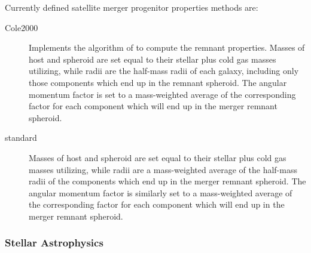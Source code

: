 Currently defined satellite merger progenitor properties methods are:
\begin{description}
 \item [{\normalfont \ttfamily Cole2000}] Implements the algorithm of \cite{cole_hierarchical_2000} to compute the remnant properties. Masses of host and spheroid are set equal to their stellar plus cold gas masses utilizing, while radii are the half-mass radii of each galaxy, including only those components which end up in the remnant spheroid. The angular momentum factor is set to a mass-weighted average of the corresponding factor for each component which will end up in the merger remnant spheroid.
 \item [{\normalfont \ttfamily standard}] Masses of host and spheroid are set equal to their stellar plus cold gas masses utilizing, while radii are a mass-weighted average of the half-mass radii of the components which end up in the merger remnant spheroid. The angular momentum factor is similarly set to a mass-weighted average of the corresponding factor for each component which will end up in the merger remnant spheroid.
\end{description}

\subsubsection{Stellar Astrophysics}

